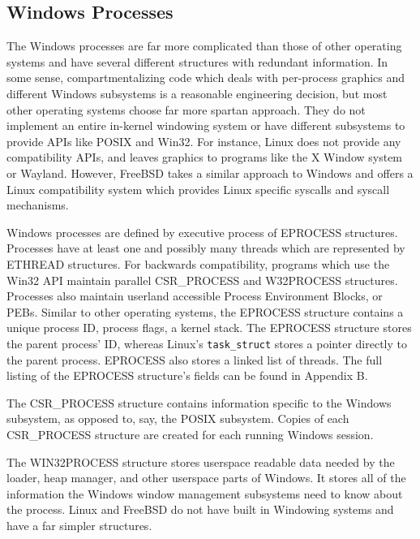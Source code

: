 \documentclass[10pt,conference,draftclsnofoot,onecolumn]{IEEEtran}
\begin{document}
\subsection{Windows Processes}
The Windows processes are far more complicated than those of other operating systems and have several different structures with redundant information. In some sense, compartmentalizing code which deals with per-process graphics and different Windows subsystems is a reasonable engineering decision, but most other operating systems choose far more spartan approach. They do not implement an entire in-kernel windowing system or have different subsystems to provide APIs like POSIX and Win32. For instance, Linux does not provide any compatibility APIs, and leaves graphics to programs like the X Window system or Wayland. However, FreeBSD takes a similar approach to Windows and offers a Linux compatibility system which provides Linux specific syscalls and syscall mechanisms.

Windows processes are defined by executive process of EPROCESS structures. Processes have at least one and possibly many threads which are represented by ETHREAD structures. For backwards compatibility, programs which use the Win32 API maintain parallel CSR\_PROCESS and W32PROCESS structures. Processes also maintain userland accessible Process Environment Blocks, or PEBs. Similar to other operating systems, the EPROCESS structure contains a unique process ID, process flags, a kernel stack. The EPROCESS structure stores the parent process' ID, whereas Linux's \texttt{task\_struct} stores a pointer directly to the parent process. EPROCESS also stores a linked list of threads. The full listing of the EPROCESS structure's fields can be found in Appendix B.

The CSR\_PROCESS structure contains information specific to the Windows subsystem, as opposed to, say, the POSIX subsystem. Copies of each CSR\_PROCESS structure are created for each running Windows session.

The WIN32PROCESS structure stores userspace readable data needed by the loader, heap manager, and other userspace parts of Windows. It stores all of the information the Windows window management subsystems need to know about the process. Linux and FreeBSD do not have built in Windowing systems and have a far simpler structures.
\end{document}
